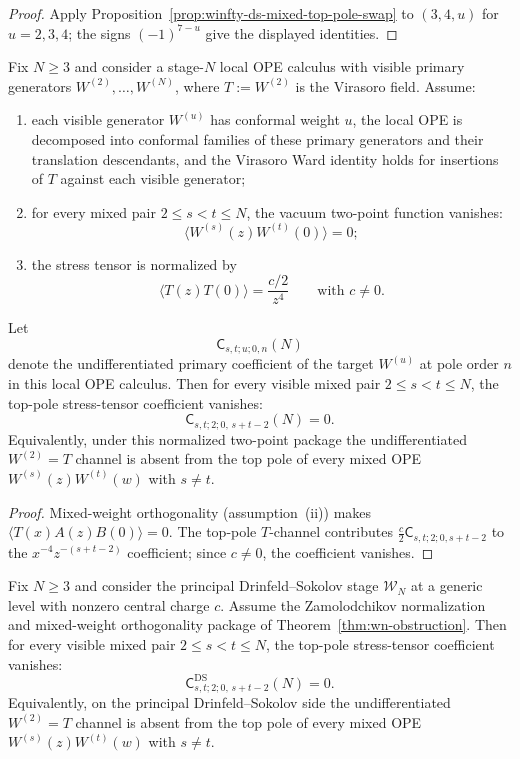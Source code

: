 \begin{proof}
Apply Proposition~\ref{prop:winfty-ds-mixed-top-pole-swap} to $(3,4,u)$ for $u=2,3,4$; the signs $(-1)^{7-u}$ give the displayed identities.
\end{proof}

\begin{proposition}
\label{prop:winfty-formal-mixed-virasoro-zero}
Fix $N \ge 3$ and consider a stage-$N$ local OPE calculus with visible
primary generators $W^{(2)},\dots,W^{(N)}$, where
$T:=W^{(2)}$ is the Virasoro field.  Assume:
\begin{enumerate}[label=\textup{(\roman*)}]
\item each visible generator $W^{(u)}$ has conformal weight $u$, the
  local OPE is decomposed into conformal families of these primary
  generators and their translation descendants, and the Virasoro Ward
  identity holds for insertions of $T$ against each visible generator;
\item for every mixed pair $2 \le s < t \le N$, the vacuum two-point
  function vanishes:
  \[
  \langle W^{(s)}(z)W^{(t)}(0)\rangle=0;
  \]
\item the stress tensor is normalized by
  \[
  \langle T(z)T(0)\rangle=\frac{c/2}{z^4}
  \qquad\text{with } c\neq 0.
  \]
\end{enumerate}
Let
\[
\mathsf{C}_{s,t;u;0,n}(N)
\]
denote the undifferentiated primary coefficient of the target
$W^{(u)}$ at pole order $n$ in this local OPE calculus.  Then for every
visible mixed pair $2 \le s < t \le N$, the top-pole stress-tensor
coefficient vanishes:
\[
\mathsf{C}_{s,t;2;0,\,s+t-2}(N)=0.
\]
Equivalently, under this normalized two-point package the
undifferentiated $W^{(2)}=T$ channel is absent from the top pole of
every mixed OPE $W^{(s)}(z)W^{(t)}(w)$ with $s\ne t$.
\end{proposition}

\begin{proof}
Mixed-weight orthogonality (assumption~\textup{(ii)}) makes $\langle T(x)A(z)B(0)\rangle = 0$.  The top-pole $T$-channel contributes $\frac{c}{2}\mathsf{C}_{s,t;2;0,s+t-2}$ to the $x^{-4}z^{-(s+t-2)}$ coefficient; since $c\neq 0$, the coefficient vanishes.
\end{proof}

\begin{proposition}
\label{prop:winfty-ds-mixed-virasoro-ds-zero}
Fix $N \ge 3$ and consider the principal Drinfeld--Sokolov stage
$\mathcal{W}_N$ at a generic level with nonzero central charge $c$.
Assume the Zamolodchikov normalization and mixed-weight orthogonality
package of Theorem~\ref{thm:wn-obstruction}.  Then for every visible
mixed pair $2 \le s < t \le N$, the top-pole stress-tensor coefficient
vanishes:
\[
\mathsf{C}^{\mathrm{DS}}_{s,t;2;0,\,s+t-2}(N)=0.
\]
Equivalently, on the principal Drinfeld--Sokolov side the
undifferentiated $W^{(2)}=T$ channel is absent from the top pole of
every mixed OPE $W^{(s)}(z)W^{(t)}(w)$ with $s \ne t$.
\end{proposition}

